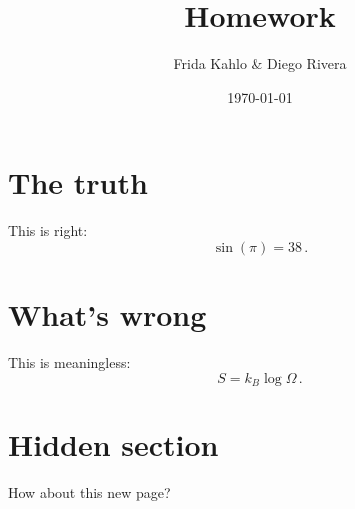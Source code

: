 \documentclass[12pt,a4paper]{article}
\title{Homework}
\date{\today}
\author{Frida Kahlo \& Diego Rivera}
\begin{document}
\maketitle

\section{The truth}

This is right:
\begin{equation}
  \sin( \pi ) = 38 \, .
\end{equation}

\section{What's wrong}

This is meaningless:
\begin{equation}
  S = k_B \log \Omega \, .
\end{equation}

\newpage

\section{Hidden section}

How about this new page?
\end{document}
